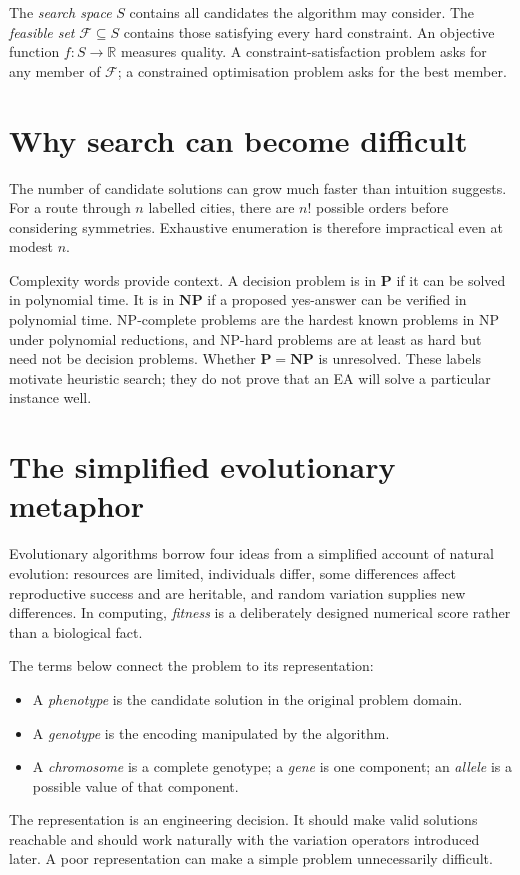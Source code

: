 \documentclass[11pt,a4paper]{article}
\newcommand{\R}{\mathbb{R}}
\begin{document}
The \emph{search space} $S$ contains all candidates the algorithm may consider. The \emph{feasible set} $\mathcal F\subseteq S$ contains those satisfying every hard constraint. An objective function $f:S\to\R$ measures quality. A constraint-satisfaction problem asks for any member of $\mathcal F$; a constrained optimisation problem asks for the best member.

\section{\enspace Why search can become difficult}
The number of candidate solutions can grow much faster than intuition suggests. For a route through $n$ labelled cities, there are $n!$ possible orders before considering symmetries. Exhaustive enumeration is therefore impractical even at modest $n$.

Complexity words provide context. A decision problem is in $\mathbf P$ if it can be solved in polynomial time. It is in $\mathbf{NP}$ if a proposed yes-answer can be verified in polynomial time. NP-complete problems are the hardest known problems in NP under polynomial reductions, and NP-hard problems are at least as hard but need not be decision problems. Whether $\mathbf P=\mathbf{NP}$ is unresolved. These labels motivate heuristic search; they do not prove that an EA will solve a particular instance well.

\section{\enspace The simplified evolutionary metaphor}
Evolutionary algorithms borrow four ideas from a simplified account of natural evolution: resources are limited, individuals differ, some differences affect reproductive success and are heritable, and random variation supplies new differences. In computing, \emph{fitness} is a deliberately designed numerical score rather than a biological fact.

The terms below connect the problem to its representation:
\begin{itemize}
\item A \emph{phenotype} is the candidate solution in the original problem domain.
\item A \emph{genotype} is the encoding manipulated by the algorithm.
\item A \emph{chromosome} is a complete genotype; a \emph{gene} is one component; an \emph{allele} is a possible value of that component.
\end{itemize}
The representation is an engineering decision. It should make valid solutions reachable and should work naturally with the variation operators introduced later. A poor representation can make a simple problem unnecessarily difficult.
\end{document}
